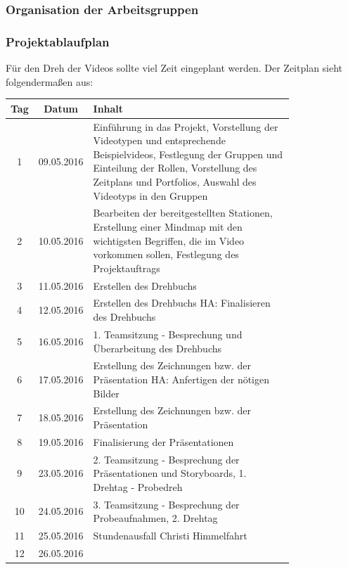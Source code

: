 \documentclass[a4paper,12pt,twoside=false]{scrartcl}
\begin{document}
\subsubsection{Organisation der Arbeitsgruppen}
 \subsubsection{Projektablaufplan}
Für den Dreh der Videos sollte viel Zeit eingeplant werden. Der Zeitplan sieht folgendermaßen aus:\\
\begin{longtable}{|c|c|p{0.8\linewidth}|}\hline
\cellcolor{yellow}Tag&\cellcolor{violet}Datum & \cellcolor{cyan}Inhalt\\\hline
1&\cellcolor{pink}09.05.2016& Einführung in das Projekt, Vorstellung der Videotypen und entsprechende Beispielvideos, Festlegung der Gruppen und Einteilung der Rollen, Vorstellung des Zeitplans und Portfolios, Auswahl des Videotyps in den Gruppen\\\hline
2&\cellcolor{pink}10.05.2016& Bearbeiten der bereitgestellten Stationen, Erstellung einer Mindmap mit den wichtigsten Begriffen, die im Video vorkommen sollen, Festlegung des Projektauftrags \\\hline
3&\cellcolor{pink}11.05.2016&Erstellen des Drehbuchs \\\hline
4&\cellcolor{pink}12.05.2016&Erstellen des Drehbuchs \newline HA: Finalisieren des Drehbuchs\\\hline

5&\cellcolor{pink}16.05.2016& 1. Teamsitzung - Besprechung und Überarbeitung des Drehbuchs\\\hline
6&\cellcolor{pink}17.05.2016&Erstellung des Zeichnungen bzw. der Präsentation HA: Anfertigen der nötigen Bilder\\\hline
7&\cellcolor{pink}18.05.2016&Erstellung des Zeichnungen bzw. der Präsentation\\\hline
8& \cellcolor{pink}19.05.2016&Finalisierung der Präsentationen \\\hline

9&\cellcolor{pink}23.05.2016& 2. Teamsitzung - Besprechung der Präsentationen und Storyboards,
1. Drehtag - Probedreh\\\hline
10&\cellcolor{pink}24.05.2016& 3. Teamsitzung - Besprechung der Probeaufnahmen, 2. Drehtag\\\hline
\rowcolor{red}11&\cellcolor{pink}25.05.2016&  Stundenausfall Christi Himmelfahrt\\\hline
12&\cellcolor{pink}26.05.2016&\\\hline


\end{longtable}
\end{document}
